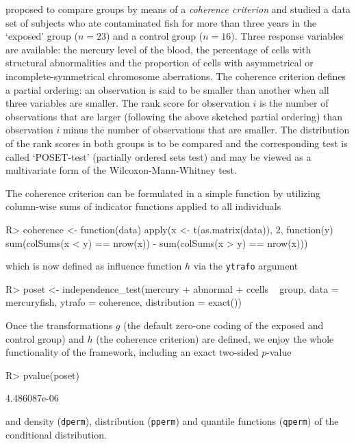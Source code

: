 \documentclass{article}
\newcommand{\Rcmd}[1]{\texttt{#1}}
\newenvironment{Schunk}{}{}
\begin{document}
\cite{Rosenbaum1994a} proposed to compare groups by means of a
\textit{coherence criterion} and studied a data set of subjects 
who ate contaminated fish for more than three years in
the `exposed' group ($n = 23$) and a control group ($n = 16$). 
Three response variables are
available: the mercury level of the blood, the percentage of cells with
structural abnormalities and the proportion of cells with asymmetrical or
incomplete-symmetrical chromosome aberrations.
The coherence criterion defines a partial ordering: 
an observation is said to be smaller than another when all three variables
are smaller. The rank score for observation $i$ is the number of
observations that are larger (following the above sketched partial ordering) 
than observation $i$ minus the number of
observations that are smaller. The
distribution of the rank scores in both groups is to be compared and
the corresponding test is called `POSET-test' (partially ordered
sets test) and may be viewed as a multivariate form of the
Wilcoxon-Mann-Whitney test.

The coherence criterion can be formulated in a simple function by utilizing 
column-wise sums of indicator functions applied to all individuals
\begin{Schunk}
\begin{Sinput}
R> coherence <- function(data)
       apply(x <- t(as.matrix(data)), 2, function(y) 
           sum(colSums(x < y) == nrow(x)) - 
           sum(colSums(x > y) == nrow(x)))
\end{Sinput}
\end{Schunk}
which is now defined as influence function $h$ via the \Rcmd{ytrafo} argument
\begin{Schunk}
\begin{Sinput}
R> poset <- independence_test(mercury + abnormal + ccells ~ group, 
       data = mercuryfish, ytrafo = coherence, 
       distribution = exact())
\end{Sinput}
\end{Schunk}
Once the transformations $g$ (the default zero-one coding of the exposed and control
group) and $h$ (the coherence criterion) are defined, we enjoy the whole
functionality of the framework, including an exact two-sided $p$-value
\begin{Schunk}
\begin{Sinput}
R> pvalue(poset)
\end{Sinput}
\begin{Soutput}
[1] 4.486087e-06
\end{Soutput}
\end{Schunk}
and density (\Rcmd{dperm}), distribution (\Rcmd{pperm}) and quantile functions 
(\Rcmd{qperm}) of the conditional distribution. 
\end{document}
